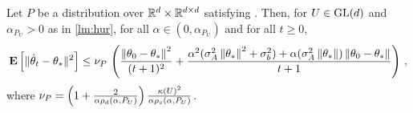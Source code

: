 \begin{comment}
\begin{theorem}\label{th:pdrate}
Let $P^A$ in \Cref{assmp:lsa}-~\ref{dist} be a positive definite distribution over $\C^{\dcd}$. Then
\begin{align*}
\EE{\norm{\thh_t-\ts}^2}
\leq
\left(1+\frac2{\alpha\rhod{P}}\right)\frac{1}{\alpha \rhos{P}}
\left(\frac{\norm{\theta_0-\ts}^2}{(t+1)^2}+ \frac{\alpha^2(\sigma_P^2\norm{\ts}^2+\sigma_b^2)+\alpha (\sigma_P^2\norm{\ts})\norm{\theta_0-\ts}}{t+1} \right)\,.
\end{align*}
\end{theorem}

\begin{theorem}\label{thm:simtran}[Change of Basis]
Let $P$ in \Cref{assmp:lsa}-~\ref{dist} be AS. Define $\gamma_t\eqdef U^{-1}\theta_t,\,,\gamma^*\eqdef U^{-1}\ts$, and suppose if $P_U$ is positive definite, then
\begin{align*}
\EE{\norm{\gh_t-\gamma^*}^2}
\leq
\left(1+\frac2{\alpha\rhod{P_U}}\right)\frac{\norm{U^{-1}}^2}{\alpha \rhos{P_U}}
\left(\frac{\norm{\theta_0-\ts}^2}{(t+1)^2}+ \frac{\alpha^2(\sigma_P^2\norm{\ts}^2+\sigma_b^2)+\alpha (\sigma_P^2\norm{\ts})\norm{\theta_0-\ts}}{t+1} \right)\,.
\end{align*}
where $\gh_t=\frac{1}{t+1}\sum_{s=0}^t \gamma_s$.
\end{theorem}
\end{comment}

\begin{theorem}\label{th:rate}
Let $P$ be a distribution over $\mathbb{R}^d\times \mathbb{R}^{d \times d}$ satisfying .
Then, for  $U\in\mathrm{GL}(d)$ and $\alpha_{P_U}>0$ as in \cref{lm:hur},
for all $\alpha\in (0,\alpha_{P_U})$ and for all $t\ge 0$,
\begin{align*}
\mathbf{E}\left[\| \hat{\theta}_t-\theta_*\|^2\right]
\leq
\nu_P\,
\left(\frac{\left\| \theta_0-\theta_*\right\|^2}{(t+1)^2}+ \frac{\alpha^2(\sigma_A^2\left\| \theta_*\right\|^2+\sigma_b^2)+\alpha (\sigma_A^2\left\| \theta_*\right\|)\left\| \theta_0-\theta_*\right\|}{t+1} \right)\,,
\end{align*}
where $\nu_P = \left(1+\tfrac2{\alpha\rho_d(\alpha,P_U)}\right)\tfrac{\kappa(U)^2}{\alpha \rho_s(\alpha,P_U)}$.
\end{theorem}


